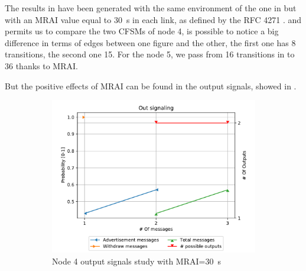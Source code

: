 The results in  have been generated with the same
environment of the one in  but with an \ac{MRAI} value
equal to \SI{30}{\second} in each link, as defined by the \ac{RFC} \num{4271}
\cite{rfc4271}.
 and  permits us to compare the two
\ac{CFSM}s of node \num{4}, is possible to notice a big difference in terms of edges
between one figure and the other, the first one has \num{8} transitions, the
second one \num{15}.
For the node \num{5}, we pass from \num{16} transitions in 
to \num{36} thanks to \ac{MRAI}.

But the positive effects of \ac{MRAI} can be found in the output signals,
showed in .

\begin{figure}[h]
     \centering
     \begin{subfigure}[b]{0.45\textwidth}
         \centering
         \includegraphics[width=\textwidth]{images/signal_study/fig_4_MRAI/fig_4_4_signaling_nmessage_prob.pdf}
		 \caption{Node \num{4} output signals study with \ac{MRAI}=\SI{30}{\second}}
         \label{fig:signal_node4_MRAI}
     \end{subfigure}
     \hfill
     \begin{subfigure}[b]{0.45\textwidth}
         \centering

\end{subfigure}
\end{figure}
